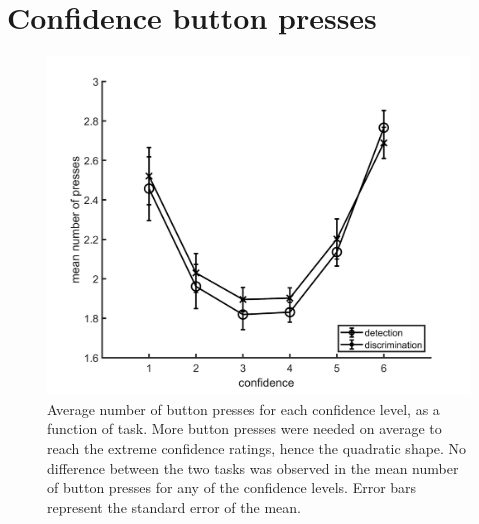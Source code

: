 \documentclass[12pt,twoside]{reedthesis}
\begin{document}
\hypertarget{app3-buttonpresses}{%
\section{Confidence button presses}\label{app3-buttonpresses}}
\begin{figure}[H]
\includegraphics[width=\linewidth]{figure/fMRI/buttonPresses} \caption[Button presses, imaging experiment]{Average number of button presses for each confidence level, as a function of task. More button presses were needed on average to reach the extreme confidence ratings, hence the quadratic shape. No difference between the two tasks was observed in the mean number of button presses for any of the confidence levels. Error bars represent the standard error of the mean.}\label{fig:buttonpresses}
\end{figure}
\newpage
\end{document}
